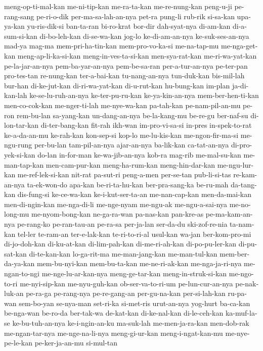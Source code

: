{meng-op-ti-mal-kan me-ni-tip-kan me-ra-ta-kan me-re-nung-kan peng-u-ji pe-rang-sang pe-ri-o-dik per-ma-sa-lah-an-nya
pet-ra pung-li rub-rik si-sa-kan upa-ya-kan yu-ris-dik-si ban-ta-ran bi-ro-krat
bor-dir dah-syat-nya di-am-kan di-a-sum-si-kan di-bo-leh-kan di-se-wa-kan jog-lo ke-di-am-an-nya
ke-suk-ses-an-nya mad-ya mag-ma mem-pri-ha-tin-kan mem-pro-vo-ka-si me-na-tap-mu me-nga-get-kan meng-ap-li-ka-si-kan
meng-in-ves-ta-si-kan men-sya-rat-kan me-ri-wa-yat-kan pe-la-jar-an-nya pem-ba-yar-an-nya pem-be-sa-ran per-a-tur-an-nya pe-ter-pan
pro-tes-tan re-nung-kan ter-a-bai-kan tu-nang-an-nya tun-duk-kan bis-mil-lah bur-han di-ke-jut-kan
di-ri-wa-yat-kan di-u-rut-kan hu-bung-kan im-plan ja-di-kan-lah ke-se-lu-ruh-an-nya ke-ter-pu-ru-kan ke-ya-kin-an-nya
mem-ber-hen-ti-kan men-co-cok-kan me-nger-ti-lah me-nye-wa-kan pa-tah-kan pe-nam-pil-an-mu pe-ron rem-bu-lan
sa-yang-kan un-dang-an-nya be-la-kang-mu be-re-gu ber-naf-su di-lon-tar-kan di-ter-bang-kan fit-rah
ikh-wan im-pro-vi-sa-si in-pres in-spek-to-rat ke-a-da-an-mu ke-rah-kan kon-sep-si kop-lo
me-lu-kis-kan me-ngon-fir-ma-si me-ngu-rung per-bu-lan tam-pil-an-nya ajar-an-nya ba-lik-kan ca-tat-an-nya
di-pro-yek-si-kan do-lan in-for-man ke-wa-jib-an-nya kob-ra mag-rib me-mal-su-kan me-man-tap-kan
men-cam-pur-kan meng-ha-rum-kan meng-hin-dar-kan me-ngu-lur-kan me-ref-lek-si-kan nit-rat pa-sut-ri peng-a-men
per-se-tan pub-li-si-tas re-kam-an-nya ta-ek-won-do apa-kan be-ri-ta-hu-kan ber-pra-sang-ka be-ru-mah
da-tang-kan dis-fung-si ke-ce-wa-kan ke-i-kut-ser-ta-an me-nan-cap-kan men-da-mai-kan men-di-ngin-kan me-nga-di-li
me-nge-nyam me-ngu-ak me-ngu-a-sai-nya me-no-long-mu me-nyom-bong-kan ne-ga-ra-wan pa-nas-kan pan-kre-as
pe-ma-kam-an-nya pe-rang-ko pe-ran-tau-an pe-ra-sa per-ja-lan ser-da-du ski-zof-re-nia ta-nam-kan
tel-ler te-ram-an ter-e-lak-kan te-ri-to-ri-al usul-kan wa-jan ber-kom-pro-mi di-jo-doh-kan
di-ku-at-kan di-lim-pah-kan di-me-ri-ah-kan di-po-pu-ler-kan di-pu-sat-kan di-te-kan-kan lo-ga-rit-ma me-man-jang-kan
me-man-tul-kan mem-ber-da-ya-kan mem-bu-nyi-kan mem-bu-ta-kan me-ne-ri-ak-kan me-nga-ja-ri-nya me-ngan-to-ngi me-nge-lu-ar-kan-nya
meng-ge-tar-kan meng-in-struk-si-kan me-ngo-to-ri me-nyi-sip-kan me-nyu-guh-kan ob-ser-va-to-ri-um pe-lun-cur-an-nya pe-nak-luk-an
pe-ra-ga pe-rang-nya pe-re-gang-an per-gu-na-kan per-si-lah-kan ru-pa-wan sem-bo-yan se-nya-man
set-ri-ka si-met-ris urut-an-nya yog-hurt ba-ca-kan be-nga-wan be-ro-da ber-tak-wa
de-kat-kan di-ke-nal-kan di-le-ceh-kan ka-muf-la-se ke-bu-tuh-an-nya ke-i-ngin-an-ku ma-suk-lah me-men-ja-ra-kan
men-dob-rak me-ngan-tar-nya me-nge-na-li-nya meng-gi-ur-kan meng-i-ngat-kan-mu me-nye-pe-le-kan pe-ker-ja-an-mu si-mul-tan
}
